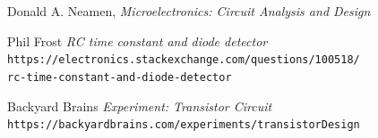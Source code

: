\documentclass[12pt, a4paper]{article}
\begin{document}
\begin{thebibliography}{500}

	  Donald A. Neamen,
	  \textit{Microelectronics: Circuit Analysis and Design}

	Phil Frost
	\textit{RC time constant and diode detector}
	\texttt{https://electronics.stackexchange.com/questions/100518/\\rc-time-constant-and-diode-detector}

	Backyard Brains
	\textit{Experiment: Transistor Circuit}
	\texttt{https://backyardbrains.com/experiments/transistorDesign}

\end{thebibliography}
\end{document}
